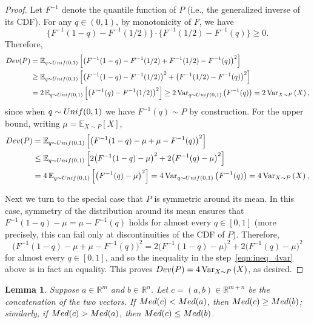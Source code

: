 \documentclass[12pt]{article}
\newtheorem{lemma}[theorem]{Lemma}
\newcommand{\R}{\mathbb{R}}
\newcommand{\Vp}[2]{\mathrm{Var}_{{#1}}\left({#2}\right)}
\newcommand{\Ep}[2]{\mathbb{E}_{{#1}}\left[{#2}\right]}
\begin{document}
\begin{proof} Let $F^{-1}$ denote the quantile function of $P$ (i.e., the generalized inverse of its CDF).
    For any $q \in (0,1)$, by monotonicity of $F$, we have
\[
\bigl\{F^{-1}(1-q)-F^{-1}(1/2)\bigr\}\cdot \bigl\{F^{-1}(1/2)-F^{-1}(q)\bigr\} \geq 0.
\]
Therefore,
    \begin{align*}
        \textnormal{Dev}(P)
        &=\Ep{q\sim \textnormal{Unif}(0,1)}{\bigl(F^{-1}(1-q)-F^{-1}(1/2)+F^{-1}(1/2)-F^{-1}(q)\bigr)^2}\\
        &\geq \Ep{q\sim \textnormal{Unif}(0,1)}{\bigl(F^{-1}(1-q)-F^{-1}(1/2)\bigr)^2+\bigl(F^{-1}(1/2)-F^{-1}(q)\bigr)^2}\\
        &=2\,\Ep{q\sim \textnormal{Unif}(0,1)}{\bigl(F^{-1}(q)-F^{-1}(1/2)\bigr)^2} \geq 2\,\Vp{q\sim\textnormal{Unif}(0,1)}{F^{-1}(q)} = 2\,\Vp{X\sim P}{X},
    \end{align*}
    since when $q\sim\textnormal{Unif}(0,1)$ we have $F^{-1}(q)\sim P$ by construction. For the upper bound, writing $\mu = \Ep{X\sim P}{X}$, 
        \begin{align}
        \textnormal{Dev}(P)
        \notag&=\Ep{q\sim \textnormal{Unif}(0,1)}{\bigl(F^{-1}(1-q)-\mu+\mu-F^{-1}(q)\bigr)^2}\\
        \label{eqn:ineq_4var}&\leq \Ep{q\sim \textnormal{Unif}(0,1)}{2\bigl(F^{-1}(1-q)-\mu\bigr)^2 + 2\bigl(F^{-1}(q) - \mu\bigr)^2}\\
        \notag&=4\,\Ep{q\sim \textnormal{Unif}(0,1)}{\bigl(F^{-1}(q)-\mu\bigr)^2} = 4\,\Vp{q\sim\textnormal{Unif}(0,1)}{F^{-1}(q)} = 4\,\Vp{X\sim P}{X},
    \end{align}
    
    Next we turn to the special case that $P$ is symmetric around its mean. In this case, symmetry of the distribution around its mean ensures that $F^{-1}(1-q)-\mu = \mu-F^{-1}(q)$ holds for almost every $q\in[0,1]$ (more precisely, this can fail only at discontinuities of the CDF of $P$). Therefore,
    \[\bigl(F^{-1}(1-q)-\mu+\mu-F^{-1}(q)\bigr)^2 = 2\bigl(F^{-1}(1-q)-\mu\bigr)^2 + 2\bigl(F^{-1}(q) - \mu\bigr)^2\]
    for almost every $q\in[0,1]$, and so the inequality in the step~\eqref{eqn:ineq_4var} above is in fact an equality. This proves $\textnormal{Dev}(P)=4\,\Vp{X\sim P}{X}$, as desired.
\end{proof}
\begin{lemma}\label{lem:a-median-result}
Suppose $a\in\R^m$ and $b\in\R^n$. Let $c=(a,b)\in\R^{m+n}$ be the concatenation of the two vectors. If $\textnormal{Med}(c)< \textnormal{Med}(a)$, then $\textnormal{Med}(c)\geq\textnormal{Med}(b)$; similarly, if $\textnormal{Med}(c)>\textnormal{Med}(a)$, then $\textnormal{Med}(c)\leq\textnormal{Med}(b)$.
\end{lemma}
\end{document}
